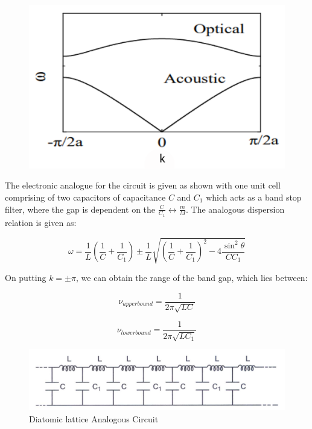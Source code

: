 		\begin{figure}[h]
			\centering
			\includegraphics[width=0.9\columnwidth]{images/theory4.png}
		\end{figure}

		The electronic analogue for the circuit is given as shown with one unit cell comprising of two capacitors of capacitance $C$ and $C_1$ which acts as a band stop filter, where the gap is dependent on the $\frac{C}{C_1} \leftrightarrow \frac{m}{M}$. The analogous dispersion relation is given as:

		$$\omega = \frac{1}{L}\left(\frac{1}{C}+\frac{1}{C_1}\right)\pm \frac{1}{L}\sqrt{\left(\frac{1}{C}+\frac{1}{C_1}\right)^2 - 4 \frac{\sin^2\theta}{CC_1}}$$

		On putting $k = \pm\pi$, we can obtain the range of the band gap, which lies between:

		\begin{equation}
			\nu_{upperbound} = \frac{1}{2\pi\sqrt{LC}}
			\label{eqn:5}
		\end{equation}

		\begin{equation}
			\nu_{lowerbound} = \frac{1}{2\pi\sqrt{LC_1}}
			\label{eqn:6}
		\end{equation}

		\begin{figure}[h]
			\centering
			\includegraphics[width=0.9\columnwidth]{images/circ2.png}
			\caption{Diatomic lattice Analogous Circuit}
			\label{fig:circ2}
		\end{figure}